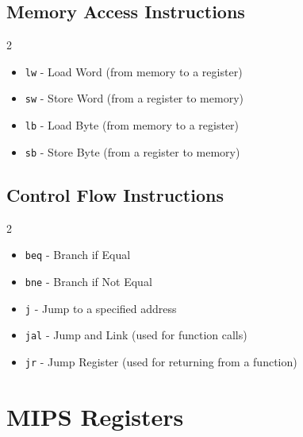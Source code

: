 \subsection{Memory Access Instructions}
\begin{multicols}{2}
   \begin{itemize}[parsep=0pt]
      \item \texttt{lw} - Load Word (from memory to a register)
      \item \texttt{sw} - Store Word (from a register to memory)
      \item \texttt{lb} - Load Byte (from memory to a register)
      \item \texttt{sb} - Store Byte (from a register to memory)
   \end{itemize}
\end{multicols}

\subsection{Control Flow Instructions}
\begin{multicols}{2}
   \begin{itemize}[parsep=0pt]
      \item \texttt{beq} - Branch if Equal
      \item \texttt{bne} - Branch if Not Equal
      \item \texttt{j} - Jump to a specified address
      \item \texttt{jal} - Jump and Link (used for function calls)
      \item \texttt{jr} - Jump Register (used for returning from a function)
   \end{itemize}
\end{multicols}

\section{MIPS Registers}

